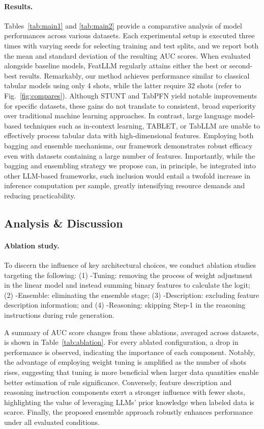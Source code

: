 \vspace*{-0.12in}
\paragraph{Results.}
Tables~\ref{tab:main1} and \ref{tab:main2} provide a comparative analysis of model performances across various datasets. Each experimental setup is executed three times with varying seeds for selecting training and test splits, and we report both the mean and standard deviation of the resulting AUC scores. When evaluated alongside baseline models, \textsf{FeatLLM} regularly attains either the best or second-best results. Remarkably, our method achieves performance similar to classical tabular models using only 4 shots, while the latter require 32 shots (refer to Fig.~\ref{fig:compares}). Although STUNT and TabPFN yield notable improvements for specific datasets, these gains do not translate to consistent, broad superiority over traditional machine learning approaches. In contrast, large language model-based techniques such as in-context learning, TABLET, or TabLLM are unable to effectively process tabular data with high-dimensional features. Employing both bagging and ensemble mechanisms, our framework demonstrates robust efficacy even with datasets containing a large number of features. Importantly, while the bagging and ensembling strategy we propose can, in principle, be integrated into other LLM-based frameworks, such inclusion would entail a twofold increase in inference computation per sample, greatly intensifying resource demands and reducing practicability.

\subsection{Analysis \& Discussion}
\label{sec:analysis}
\paragraph{Ablation study.} To discern the influence of key architectural choices, we conduct ablation studies targeting the following: (1) \textsf{-Tuning}: removing the process of weight adjustment in the linear model and instead summing binary features to calculate the logit; (2) \textsf{-Ensemble}: eliminating the ensemble stage; (3) \textsf{-Description}: excluding feature description information; and (4) \textsf{-Reasoning}: skipping Step-1 in the reasoning instructions during rule generation.

A summary of AUC score changes from these ablations, averaged across datasets, is shown in Table~\ref{tab:ablation}. For every ablated configuration, a drop in performance is observed, indicating the importance of each component. Notably, the advantage of employing weight tuning is amplified as the number of shots rises, suggesting that tuning is more beneficial when larger data quantities enable better estimation of rule significance. Conversely, feature description and reasoning instruction components exert a stronger influence with fewer shots, highlighting the value of leveraging LLMs’ prior knowledge when labeled data is scarce. Finally, the proposed ensemble approach robustly enhances performance under all evaluated conditions.

